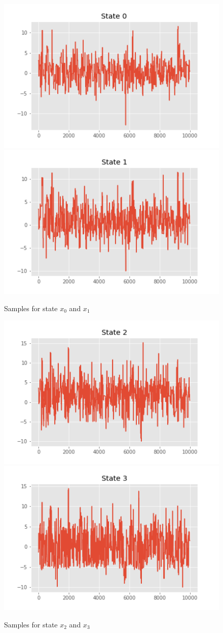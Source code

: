 \documentclass[]{article}
\begin{document}
	\begin{figure}[H]
		\begin{center}
			\includegraphics[width=.4\textwidth]{task2/figures/T_2_2/Q1/plt_x0.png}
			\includegraphics[width=.4\textwidth]{task2/figures/T_2_2/Q1/plt_x1.png}
			
			\caption*{Samples for state $x_0$ and $x_1$}
		\end{center}
	\end{figure}
	
	\begin{figure}[H]
		\begin{center}
			
			\includegraphics[width=.4\textwidth]{task2/figures/T_2_2/Q1/plt_x2.png}
			\includegraphics[width=.4\textwidth]{task2/figures/T_2_2/Q1/plt_x3.png}
			
			\caption*{Samples for state $x_2$ and $x_3$}
		\end{center}
	\end{figure}
	
\end{document}
